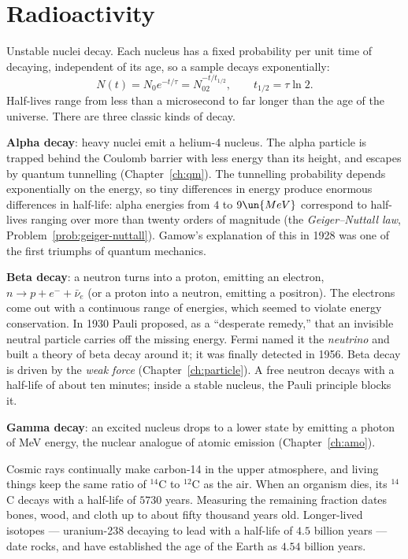 \section{Radioactivity}

Unstable nuclei decay. Each nucleus has a fixed probability per unit time of decaying, independent of its age, so a sample decays exponentially:
\[
  N(t) = N_0e^{-t/\tau} = N_02^{-t/t_{1/2}},\qquad t_{1/2} = \tau\ln2 .
\]
Half-lives range from less than a microsecond to far longer than the age of the universe. There are three classic kinds of decay.

\textbf{Alpha decay}: heavy nuclei emit a helium-4 nucleus. The alpha particle is trapped behind the Coulomb barrier with less energy than its height, and escapes by quantum tunnelling (Chapter~\ref{ch:qm}). The tunnelling probability depends exponentially on the energy, so tiny differences in energy produce enormous differences in half-life: alpha energies from $4$ to $9\un{MeV}$ correspond to half-lives ranging over more than twenty orders of magnitude (the \emph{Geiger--Nuttall law}, Problem~\ref{prob:geiger-nuttall}). Gamow's explanation of this in 1928 was one of the first triumphs of quantum mechanics.

\textbf{Beta decay}: a neutron turns into a proton, emitting an electron, $n\to p + e^- + \bar\nu_e$ (or a proton into a neutron, emitting a positron). The electrons come out with a continuous range of energies, which seemed to violate energy conservation. In 1930 Pauli proposed, as a ``desperate remedy,'' that an invisible neutral particle carries off the missing energy. Fermi named it the \emph{neutrino} and built a theory of beta decay around it; it was finally detected in 1956. Beta decay is driven by the \emph{weak force} (Chapter~\ref{ch:particle}). A free neutron decays with a half-life of about ten minutes; inside a stable nucleus, the Pauli principle blocks it.

\textbf{Gamma decay}: an excited nucleus drops to a lower state by emitting a photon of MeV energy, the nuclear analogue of atomic emission (Chapter~\ref{ch:amo}).

\begin{example}
Cosmic rays continually make carbon-14 in the upper atmosphere, and living things keep the same ratio of $^{14}$C to $^{12}$C as the air. When an organism dies, its $^{14}$C decays with a half-life of $5730$ years. Measuring the remaining fraction dates bones, wood, and cloth up to about fifty thousand years old. Longer-lived isotopes --- uranium-238 decaying to lead with a half-life of $4.5$ billion years --- date rocks, and have established the age of the Earth as $4.54$ billion years.
\end{example}

